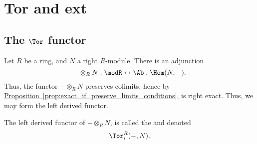 \documentclass[main.tex]{subfiles}
\begin{document}
\chapter{Tor and ext}
\label{ch:tor_and_ext}

\section{The \texorpdfstring{$\Tor$}{Tor} functor}
\label{sec:tor}

Let $R$ be a ring, and $N$ a right $R$-module. There is an adjunction
\begin{equation*}
  - \otimes_{R} N : \modR \leftrightarrow \Ab : \Hom(N, -).
\end{equation*}
Thus, the functor $- \otimes_{R} N$ preserves colimits, hence by \hyperref[prop:exact_if_preserve_limits_conditions]{Proposition~\ref*{prop:exact_if_preserve_limits_conditions}}, is right exact. Thus, we may form the left derived functor.

\begin{definition}
  \label{def:tor_functor}
  The left derived functor of $- \otimes_{R} N$, is called the  and denoted
  \begin{equation*}
    \Tor_{i}^{R}(-, N).
  \end{equation*}
\end{definition}
\end{document}
